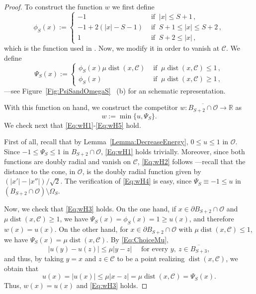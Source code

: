 \documentclass[12pt,reqno]{amsart}
\theoremstyle{definition}
\theoremstyle{remark}
\newcommand{\con}[1]{\mathbb{#1}}
\newcommand{\R}{\con{R}} %
\newcommand{\ccal}{\mathscr{C}}
\newcommand{\ocal}{\mathcal{O}}
\DeclareMathOperator{\dist}{dist}
\numberwithin{equation}{section}
\begin{document}
	\begin{proof}
		To construct the function $w$ we first define
		\begin{equation}
		\label{Eq:DefOfPhiS}
		\phi_S(x):= 
		\begin{cases}
		-1 & \textrm{ if }  \ |x| \leq S+1\,, \\
		-1 + 2 (|x| - S-1)&  \textrm{ if } \ S+1 \leq |x| \leq S+2\,, \\
		1 & \textrm{ if }  \  S+2 \leq |x|\,,
		\end{cases}
		\end{equation}
		which is the function used in \cite{SavinValdinoci-EnergyEstimate}. Now, we modify it in order to vanish at $\ccal$. We define
		$$
		\Psi_S(x) :=
		\begin{cases}
		\phi_S (x) \mu\dist(x,\ccal) &  \textrm{ if }  \  \mu\dist(x,\ccal) \leq 1 \,, \\
		\phi_S (x) & \textrm{ if }  \  \mu\dist(x,\ccal) \geq 1\,,
		\end{cases}
		$$
		---see Figure~\ref{Fig:PsiSandOmegaS}~ (b) for an schematic representation.
		
		With this function on hand, we construct the competitor  $w:\overline{B_{S+2} \cap \ocal} \to \R$ as
		$$
		w:= \min \{u, \Psi_S\}.
		$$
		We check next that \eqref{Eq:wH1}-\eqref{Eq:wH5} hold.
		
		First of all, recall that by Lemma~\ref{Lemma:DecreaseEnergy}, $0\leq u \leq 1$ in $\ocal$. Since $-1\leq \Psi_S\leq 1$ in $B_{S+2} \cap \ocal$, \eqref{Eq:wH1} holds trivially. Moreover, since both functions are doubly radial and vanish on $\ccal$, \eqref{Eq:wH2} follows ---recall that the distance to the cone, in $\ocal$, is the doubly radial function given by $(|x'|-|x''|)/\sqrt{2}$. The verification of \eqref{Eq:wH4} is easy, since $\Psi_S \equiv-1 \leq u$ in $(B_{S+2}\cap \ocal)\setminus \Omega_S$.
		
		Now, we check that \eqref{Eq:wH3} holds. On the one hand, if $x\in \partial B_{S+2}\cap \ocal$ and $\mu\dist(x,\ccal) \geq 1$, we have $\Psi_S (x) = \phi_S(x) = 1 \geq u(x)$, and therefore $w(x) = u(x)$. On the other hand, for $x\in \partial B_{S+2}\cap \ocal$ with $\mu\dist(x,\ccal) \leq 1$, we have $\Psi_S (x) = \mu \dist (x,\ccal)$. By \eqref{Eq:ChoiceMu},
		$$ 
		|u(y) - u(z)|\leq \mu |y-z| \quad \text{ for every } y, \ z \in \overline{B_{S+3}},
		$$ 
		and thus, by taking $y=x$ and $z\in \ccal$ to be a point realizing $\dist(x,\ccal)$, we obtain that
		$$ 
		u(x) = |u(x)|\leq \mu |x-z|  = \mu \dist (x,\ccal) = \Psi_S (x).
		$$ 
		Thus, $w(x) = u(x)$ and \eqref{Eq:wH3} holds.
		

\end{proof}
\end{document}
